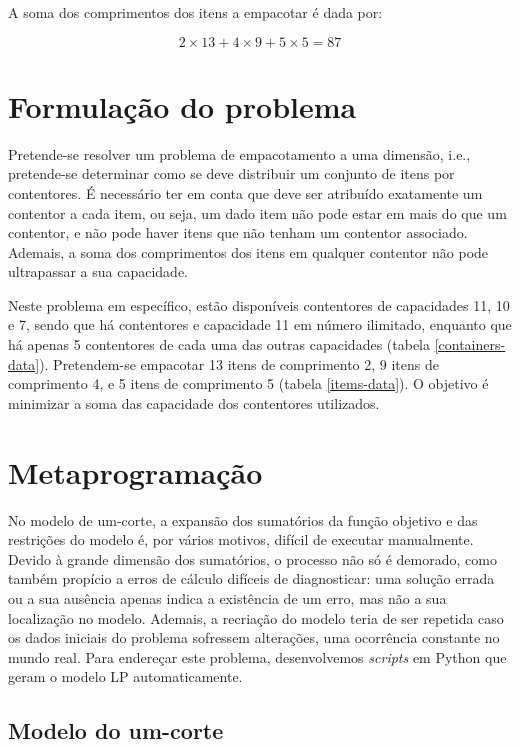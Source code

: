 \documentclass[12pt, a4paper, titlepage]{article}
\begin{document}
A soma dos comprimentos dos itens a empacotar é dada por:

\begin{equation}
    2 \times 13 + 4 \times 9 + 5 \times 5 = 87
    \label{eq:items-sum}
\end{equation}

\section{Formulação do problema}

Pretende-se resolver um problema de empacotamento a uma dimensão, i.e., pretende-se determinar como
se deve distribuir um conjunto de itens por contentores. É necessário ter em conta que deve ser
atribuído exatamente um contentor a cada item, ou seja, um dado item não pode estar em mais do que
um contentor, e não pode haver itens que não tenham um contentor associado. Ademais, a soma dos
comprimentos dos itens em qualquer contentor não pode ultrapassar a sua capacidade.

Neste problema em específico, estão disponíveis contentores de capacidades 11, 10 e 7, sendo que há
contentores e capacidade 11 em número ilimitado, enquanto que há apenas 5 contentores de cada uma
das outras capacidades (tabela \ref{containers-data}). Pretendem-se empacotar 13 itens de
comprimento 2, 9 itens de comprimento 4, e 5 itens de comprimento 5 (tabela \ref{items-data}). O
objetivo é minimizar a soma das capacidade dos contentores utilizados.


\section{Metaprogramação}

No modelo de um-corte, a expansão dos sumatórios da função objetivo e das restrições do modelo é,
por vários motivos, difícil de executar manualmente. Devido à grande dimensão dos sumatórios, o
processo não só é demorado, como também propício a erros de cálculo difíceis de diagnosticar: uma
solução errada ou a sua ausência apenas indica a existência de um erro, mas não a sua localização
no modelo. Ademais, a recriação do modelo teria de ser repetida caso os dados iniciais do problema
sofressem alterações, uma ocorrência constante no mundo real. Para endereçar este problema,
desenvolvemos \emph{scripts} em Python que geram o modelo LP automaticamente.

\subsection{Modelo do um-corte}
\end{document}

